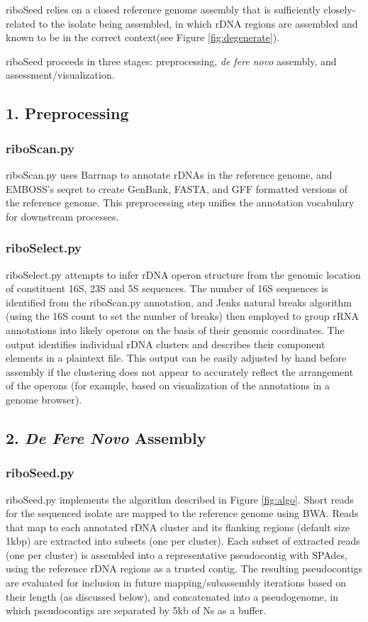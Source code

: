 \documentclass[11pt]{article}
\begin{document}
\begin{linenumbers}
riboSeed relies on a closed reference genome assembly that is sufficiently closely-related to the isolate being assembled, in which rDNA regions are assembled and known to be in the correct context(see Figure \ref{fig:degenerate}).

riboSeed proceeds in three stages: preprocessing, \textit{de fere novo} assembly, and assessment/visualization.
\subsection*{1. Preprocessing}
\subsubsection*{riboScan.py}
riboScan.py uses Barrnap\cite{Seemann2014} to annotate rDNAs in the reference genome, and EMBOSS’s seqret\cite{Rice2000} to create GenBank, FASTA, and GFF formatted versions of the reference genome. This preprocessing step unifies the annotation vocabulary for downstream processes.

\subsubsection*{riboSelect.py}
riboSelect.py attempts to infer rDNA operon structure from the genomic location of constituent 16S, 23S and 5S sequences. The number of 16S sequences is identified from the riboScan.py annotation, and Jenks natural breaks algorithm (using the 16S count to set the number of breaks) then employed to group rRNA annotations into likely operons on the basis of  their genomic coordinates. The output identifies individual rDNA clusters and describes their component elements in a plaintext file. This output can be easily adjusted by hand before assembly if the clustering does not appear to accurately reflect the arrangement of the operons (for example, based on visualization of the annotations in a genome browser).

\subsection*{2. \textit{De Fere Novo} Assembly}
\subsubsection*{riboSeed.py}
riboSeed.py implements the algorithm described in Figure \ref{fig:algo}. Short reads for the sequenced isolate are mapped to the reference genome using BWA\cite{Li 2009}. Reads that map to each annotated rDNA cluster and its flanking regions (default size 1kbp) are extracted into subsets (one per cluster). Each subset of extracted reads (one per cluster) is assembled into a representative pseudocontig with SPAdes\cite{Bankevich2012}, using the reference rDNA regions as a trusted contig. The resulting pseudocontigs are evaluated for inclusion in future mapping/subassembly iterations based on their length (as discussed below), and concatenated into a pseudogenome, in which pseudocontigs are separated by 5kb of Ns as a buffer.



\end{linenumbers}
\end{document}
